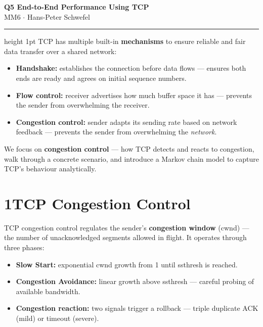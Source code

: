 \documentclass[10pt,a4paper]{article}
\begin{document}

\begin{center}
  {\large\bfseries\color{headernavy} Q5 \textemdash{} End-to-End Performance Using TCP}\\[1pt]
  {\small MM6 $\cdot$ Hans-Peter Schwefel}
\end{center}
\vspace{1pt}\hrule height 1pt\vspace{4pt}
TCP has multiple built-in \textbf{mechanisms} to ensure reliable and fair data transfer over a shared network:
\begin{itemize}
  \item \textbf{Handshake:} establishes the connection before data flows --- ensures both ends are ready and agrees on initial sequence numbers.
  \item \textbf{Flow control:} receiver advertises how much buffer space it has --- prevents the sender from overwhelming the receiver.
  \item \textbf{Congestion control:} sender adapts its sending rate based on network feedback --- prevents the sender from overwhelming the \emph{network}.
\end{itemize}

We focus on \textbf{congestion control} --- how TCP detects and reacts to congestion, walk through a concrete scenario, and introduce a Markov chain model to capture TCP's behaviour analytically.


\vspace{3pt}


\section*{1\quad TCP Congestion Control}
TCP congestion control regulates the sender's \textbf{congestion window} (cwnd) --- the number of unacknowledged segments allowed in flight. It operates through three phases:
\begin{itemize}
  \item \textbf{Slow Start:} exponential cwnd growth from 1 until ssthresh is reached.
  \item \textbf{Congestion Avoidance:} linear growth above ssthresh --- careful probing of available bandwidth.
  \item \textbf{Congestion reaction:} two signals trigger a rollback --- triple duplicate ACK (mild) or timeout (severe).
\end{itemize}
\end{document}

